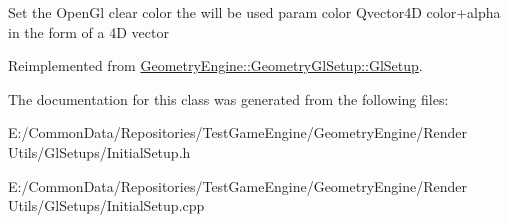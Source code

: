 Set the Open\+Gl clear color the will be used param color Qvector4D color+alpha in the form of a 4D vector 

Reimplemented from \mbox{\hyperlink{class_geometry_engine_1_1_geometry_gl_setup_1_1_gl_setup_acd5b3b2525d11f103f1d3cf298d4af94}{Geometry\+Engine\+::\+Geometry\+Gl\+Setup\+::\+Gl\+Setup}}.



The documentation for this class was generated from the following files\+:\begin{DoxyCompactItemize}
\item 
E\+:/\+Common\+Data/\+Repositories/\+Test\+Game\+Engine/\+Geometry\+Engine/\+Render Utils/\+Gl\+Setups/Initial\+Setup.\+h\item 
E\+:/\+Common\+Data/\+Repositories/\+Test\+Game\+Engine/\+Geometry\+Engine/\+Render Utils/\+Gl\+Setups/Initial\+Setup.\+cpp\end{DoxyCompactItemize}
